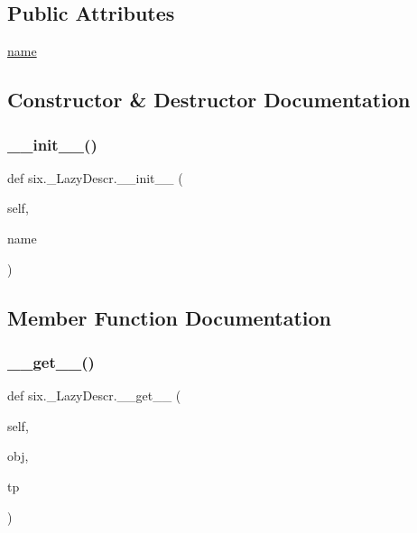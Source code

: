 \subsection*{Public Attributes}
\begin{DoxyCompactItemize}
\item 
\hyperlink{classsix_1_1__LazyDescr_ad45b705c0f4b63da8bcd1311527b2591}{name}
\end{DoxyCompactItemize}


\subsection{Constructor \& Destructor Documentation}
\mbox{\label{classsix_1_1__LazyDescr_a36b331b4c5406cb9737933449dafba71}} 
\subsubsection{\texorpdfstring{\+\_\+\+\_\+init\+\_\+\+\_\+()}{\_\_init\_\_()}}
{\footnotesize\ttfamily def six.\+\_\+\+Lazy\+Descr.\+\_\+\+\_\+init\+\_\+\+\_\+ (\begin{DoxyParamCaption}\item[{}]{self,  }\item[{}]{name }\end{DoxyParamCaption})}



\subsection{Member Function Documentation}
\mbox{\label{classsix_1_1__LazyDescr_a55983d01a267a05c04d166df35a8f8fe}} 
\subsubsection{\texorpdfstring{\+\_\+\+\_\+get\+\_\+\+\_\+()}{\_\_get\_\_()}}
{\footnotesize\ttfamily def six.\+\_\+\+Lazy\+Descr.\+\_\+\+\_\+get\+\_\+\+\_\+ (\begin{DoxyParamCaption}\item[{}]{self,  }\item[{}]{obj,  }\item[{}]{tp }\end{DoxyParamCaption})}



